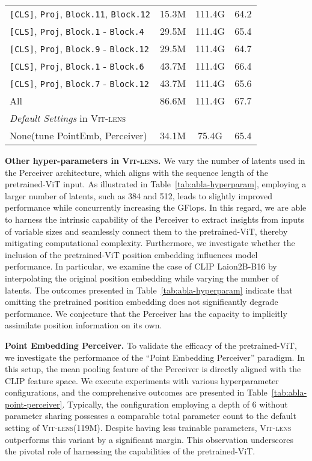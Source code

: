 \documentclass{article}
\newcommand{\ptvit}{pretrained-ViT\xspace}
\newcommand{\methodname}{{\scshape Vit-lens}\xspace}
\begin{document}
\begin{table}[t]
\begin{subtable}[h]{0.53\textwidth}
{{\begin{tabular}{l|cc|c}
  \texttt{[CLS]}, \texttt{Proj}, \texttt{Block.11}, \texttt{Block.12}  &  15.3M    & 111.4G   &  64.2    \\
  \texttt{[CLS]}, \texttt{Proj}, \texttt{Block.1} - \texttt{Block.4}    & 29.5M     & 111.4G   &  65.4    \\
  \texttt{[CLS]}, \texttt{Proj}, \texttt{Block.9} - \texttt{Block.12}    & 29.5M     & 111.4G   &  64.7    \\
  \texttt{[CLS]}, \texttt{Proj}, \texttt{Block.1} - \texttt{Block.6}    & 43.7M     & 111.4G   &   66.4   \\
  \texttt{[CLS]}, \texttt{Proj}, \texttt{Block.7} - \texttt{Block.12}    & 43.7M     & 111.4G   &  65.6    \\
  All & 86.6M  &  111.4G     &  67.7     \\ \midrule
\multicolumn{4}{l}{\textit{Default Settings} in \methodname} \\ \Xhline{2\arrayrulewidth}
  \rowcolor{lavenderweb}
  None(tune PointEmb, Perceiver) & 34.1M & 75.4G &  65.4
\end{tabular}
}
}
\end{subtable}
\end{table} 
\textbf{Other hyper-parameters in \methodname.} We vary the number of latents used in the Perceiver architecture, which aligns with the sequence length of the \ptvit input. As illustrated in Table~\ref{tab:abla-hyperparam}, employing a larger number of latents, such as 384 and 512, leads to slightly improved performance while concurrently increasing the GFlops.  
In this regard, we are able to harness the intrinsic capability of the Perceiver to extract insights from inputs of variable sizes and seamlessly connect them to the \ptvit, thereby mitigating computational complexity.
Furthermore, we investigate whether the inclusion of the \ptvit position embedding influences model performance. In particular, we examine the case of CLIP Laion2B-B16 by interpolating the original position embedding while varying the number of latents. The outcomes presented in Table~\ref{tab:abla-hyperparam} indicate that omitting the pretrained position embedding does not significantly degrade performance. We conjecture that the Perceiver has the capacity to implicitly assimilate position information on its own.


\textbf{Point Embedding  Perceiver.} To validate the efficacy of the \ptvit, we investigate the performance of the ``Point Embedding  Perceiver'' paradigm. In this setup, the mean pooling feature of the Perceiver is directly aligned with the CLIP feature space. We execute experiments with various hyperparameter configurations, and the comprehensive outcomes are presented in Table~\ref{tab:abla-point-perceiver}.
Typically, the configuration employing a depth of 6 without parameter sharing possesses a comparable total parameter count to the default setting of \methodname (119M). Despite having less trainable parameters, \methodname outperforms this variant by a significant margin. This observation underscores the pivotal role of harnessing the capabilities of the \ptvit.
\end{document}
